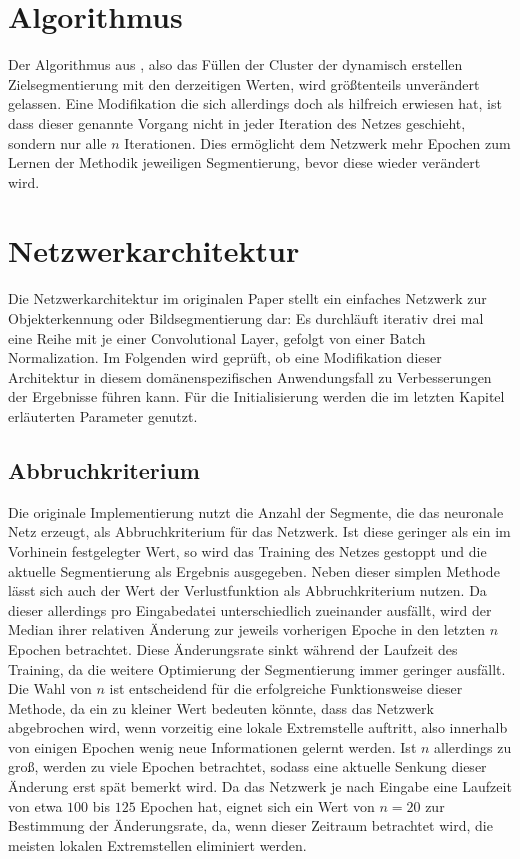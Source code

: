 \section{Algorithmus}
\label{sec:algorithm}

Der Algorithmus aus \cite{kanezaki_18}, also das Füllen der Cluster der dynamisch erstellen Zielsegmentierung mit den derzeitigen Werten, wird größtenteils unverändert gelassen. Eine Modifikation die sich allerdings doch als hilfreich erwiesen hat, ist dass dieser genannte Vorgang nicht in jeder Iteration des Netzes geschieht, sondern nur alle $n$ Iterationen. Dies ermöglicht dem Netzwerk mehr Epochen zum Lernen der Methodik jeweiligen Segmentierung, bevor diese wieder verändert wird.

\section{Netzwerkarchitektur}
\label{sec:network_architecture}

Die Netzwerkarchitektur im originalen Paper stellt ein einfaches Netzwerk zur Objekterkennung oder Bildsegmentierung dar: Es durchläuft iterativ drei mal eine Reihe mit je einer Convolutional Layer, gefolgt von einer Batch Normalization. Im Folgenden wird geprüft, ob eine Modifikation dieser Architektur in diesem domänenspezifischen Anwendungsfall zu Verbesserungen der Ergebnisse führen kann. Für die Initialisierung werden die im letzten Kapitel erläuterten Parameter genutzt.

\subsection{Abbruchkriterium}
\label{ssec:stoppingcriteria}

Die originale Implementierung nutzt die Anzahl der Segmente, die das neuronale Netz erzeugt, als Abbruchkriterium für das Netzwerk. Ist diese geringer als ein im Vorhinein festgelegter Wert, so wird das Training des Netzes gestoppt und die aktuelle Segmentierung als Ergebnis ausgegeben. Neben dieser simplen Methode lässt sich auch der Wert der Verlustfunktion als Abbruchkriterium nutzen. Da dieser allerdings pro Eingabedatei unterschiedlich zueinander ausfällt, wird der Median ihrer relativen Änderung zur jeweils vorherigen Epoche in den letzten $n$ Epochen betrachtet. Diese Änderungsrate sinkt während der Laufzeit des Training, da die weitere Optimierung der Segmentierung immer geringer ausfällt. Die Wahl von $n$ ist entscheidend für die erfolgreiche Funktionsweise dieser Methode, da ein zu kleiner Wert bedeuten könnte, dass das Netzwerk abgebrochen wird, wenn vorzeitig eine lokale Extremstelle auftritt, also \zB innerhalb von einigen Epochen wenig neue Informationen gelernt werden. Ist $n$ allerdings zu groß, werden zu viele Epochen betrachtet, sodass eine aktuelle Senkung dieser Änderung erst spät bemerkt wird. Da das Netzwerk je nach Eingabe eine Laufzeit von etwa $100$ bis $125$ Epochen hat, eignet sich ein Wert von $n=20$ zur Bestimmung der Änderungsrate, da, wenn dieser Zeitraum betrachtet wird, die meisten lokalen Extremstellen eliminiert werden.


